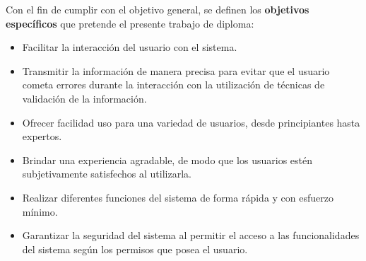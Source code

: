 Con el fin de cumplir con el objetivo general, se definen los \textbf{objetivos espec\'ificos} que pretende el presente trabajo de diploma:
\begin{itemize}
\item Facilitar la interacción del usuario con el sistema.
\item Transmitir la información de manera precisa para evitar que el usuario cometa errores durante la interacción con la utilización de técnicas de validación de la información.
\item Ofrecer facilidad uso para una variedad de usuarios, desde principiantes hasta expertos.
\item Brindar una experiencia agradable, de modo que los usuarios estén subjetivamente satisfechos al utilizarla.
\item Realizar diferentes funciones del sistema de forma rápida y con esfuerzo mínimo.
\item Garantizar la seguridad del sistema al permitir el acceso a las funcionalidades del sistema según los permisos que posea el usuario.
\end{itemize}
%
%



